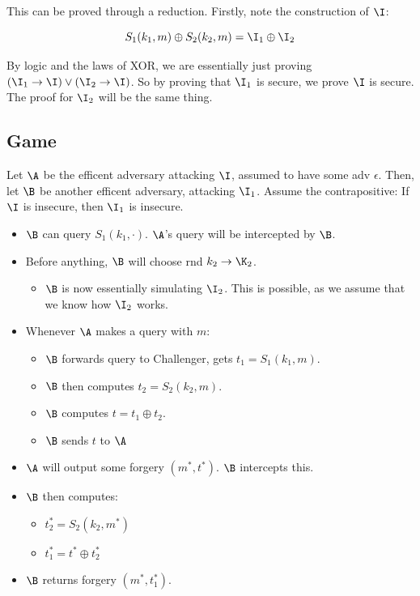 \documentclass[12pt]{article}
\begin{document}
\begin{solution}
This can be proved through a reduction. Firstly, note the construction of $\I$:

\begin{equation*}
    S_1(k_1, m) \oplus S_2(k_2, m) = \I_1 \oplus \I_2
\end{equation*}

\noindent By logic and the laws of XOR, we are essentially just proving $(\I_1 \rightarrow \I) \lor (\I_2 \rightarrow \I)$. So by proving that $\I_1$ is secure, we prove $\I$ is secure.
The proof for $\I_2$ will be the same thing.

\subsection*{Game}
Let $\A$ be the efficent adversary attacking $\I$, assumed to have some adv $\epsilon$. Then, let $\B$ be another efficent adversary, attacking $\I_1$.
Assume the contrapositive: If $\I$ is insecure, then $\I_1$ is insecure.

\begin{itemize}
    \item $\B$ can query $S_1(k_1, \cdot)$. $\A$'s query will be intercepted by $\B$.
    \item Before anything, $\B$ will choose rnd $k_2 \to \K_2$.
    \begin{itemize}
        \item $\B$ is now essentially simulating $\I_2$. This is possible, as we assume that we know how $\I_2$ works.
    \end{itemize}
    \item Whenever $\A$ makes a query with $m$:
    \begin{itemize}
        \item $\B$ forwards query to Challenger, gets $t_1 = S_1(k_1, m)$.
        \item $\B$ then computes $t_2 = S_2(k_2, m)$.
        \item $\B$ computes $t = t_1 \oplus t_2$.
        \item $\B$ sends $t$ to $\A$
    \end{itemize}
    \item $\A$ will output some forgery $(m^*, t^*)$. $\B$ intercepts this.
    \item $\B$ then computes:
    \begin{itemize}
        \item $t^*_2 = S_2(k_2, m^*)$
        \item $t^*_1 = t^* \oplus t^*_2$
    \end{itemize}
    \item $\B$ returns forgery $(m^*, t^*_1)$.
\end{itemize}


\end{solution}
\end{document}
